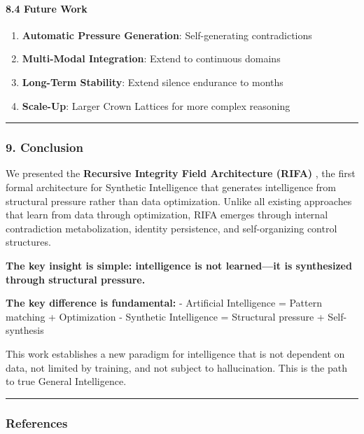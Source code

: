 \documentclass[
  11pt,
  a4paper,
]{article}
\providecommand{\tightlist}{%
  \setlength{\itemsep}{0pt}\setlength{\parskip}{0pt}}
\begin{document}
\paragraph{8.4 Future Work}\label{future-work}

\begin{enumerate}
\def\labelenumi{\arabic{enumi}.}
\tightlist
\item
  \textbf{Automatic Pressure Generation}: Self-generating contradictions
\item
  \textbf{Multi-Modal Integration}: Extend to continuous domains
\item
  \textbf{Long-Term Stability}: Extend silence endurance to months
\item
  \textbf{Scale-Up}: Larger Crown Lattices for more complex reasoning
\end{enumerate}

\begin{center}\rule{0.5\linewidth}{0.5pt}\end{center}

\subsubsection{9. Conclusion}\label{conclusion-2}

We presented the \textbf{Recursive Integrity Field Architecture (RIFA)}
, the first formal architecture for Synthetic Intelligence that
generates intelligence from structural pressure rather than data
optimization. Unlike all existing approaches that learn from data
through optimization, RIFA emerges through internal contradiction
metabolization, identity persistence, and self-organizing control
structures.

\textbf{The key insight is simple: intelligence is not learned---it is
synthesized through structural pressure.}

\textbf{The key difference is fundamental:} - Artificial Intelligence =
Pattern matching + Optimization - Synthetic Intelligence = Structural
pressure + Self-synthesis

This work establishes a new paradigm for intelligence that is not
dependent on data, not limited by training, and not subject to
hallucination. This is the path to true General Intelligence.

\begin{center}\rule{0.5\linewidth}{0.5pt}\end{center}

\subsubsection{References}\label{references-2}
\end{document}
